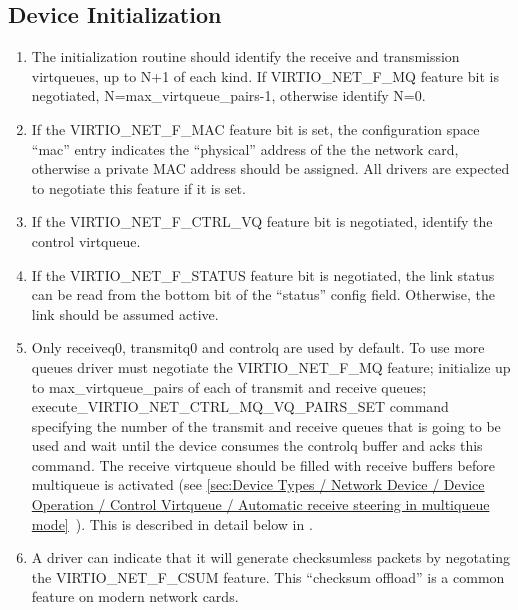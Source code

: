 \subsection{Device Initialization}\label{sec:Device Types / Network Device / Device Initialization}

\begin{enumerate}
\item The initialization routine should identify the receive and
  transmission virtqueues, up to N+1 of each kind. If
  VIRTIO_NET_F_MQ feature bit is negotiated,
  N=max_virtqueue_pairs-1, otherwise identify N=0.

\item If the VIRTIO_NET_F_MAC feature bit is set, the configuration
  space “mac” entry indicates the “physical” address of the the
  network card, otherwise a private MAC address should be
  assigned. All drivers are expected to negotiate this feature if
  it is set.

\item If the VIRTIO_NET_F_CTRL_VQ feature bit is negotiated,
  identify the control virtqueue.

\item If the VIRTIO_NET_F_STATUS feature bit is negotiated, the link
  status can be read from the bottom bit of the “status” config
  field. Otherwise, the link should be assumed active.

\item Only receiveq0, transmitq0 and controlq are used by default.
  To use more queues driver must negotiate the VIRTIO_NET_F_MQ
  feature; initialize up to max_virtqueue_pairs of each of
  transmit and receive queues;
  execute_VIRTIO_NET_CTRL_MQ_VQ_PAIRS_SET command specifying the
  number of the transmit and receive queues that is going to be
  used and wait until the device consumes the controlq buffer and
  acks this command.
  The receive virtqueue should be filled with receive buffers
  before multiqueue is activated
  (see \ref{sec:Device Types / Network Device / Device Operation / Control Virtqueue / Automatic receive steering in multiqueue mode}~).
  This is described in detail below in .

\item A driver can indicate that it will generate checksumless
  packets by negotating the VIRTIO_NET_F_CSUM feature. This 
  “checksum offload” is a common feature on modern network cards.


\end{enumerate}
